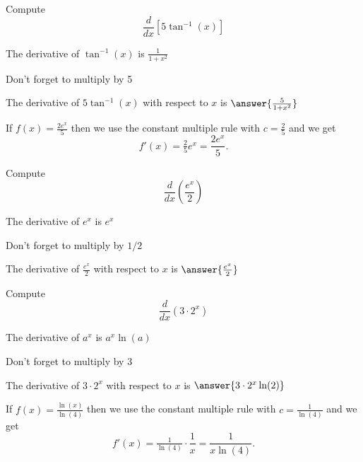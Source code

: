 \documentclass[handout]{ximera}
\begin{document}
\begin{problem} %
  Compute 
  \[
  \frac{d}{dx} \left[5\tan^{-1}(x)\right]
  \]
  
    \begin{hint}
      The derivative of $\tan^{-1}(x)$ is $\frac{1}{1+x^2}$
    \end{hint}
		\begin{hint}
		  Don't forget to multiply by 5
		\end{hint}
		
		The derivative of $5\tan^{-1}(x)$ with respect to $x$ is
		 $\answer{\frac{5}{1+x^2}}$
	
\end{problem}


\begin{example} %
 If $f(x) = \frac{2e^x}{5}$ then we use the constant multiple rule with $c = \frac25$ and we get 
\[
f'(x) = \tfrac25 e^x = \frac{2e^x}{5}.
\]
\end{example}


\begin{problem} %
  Compute 
  \[
  \frac{d}{dx} \left(\frac{e^x}{2}\right)
  \]
  
    \begin{hint}
      The derivative of $e^x$ is $e^x$
    \end{hint}
		\begin{hint}
		  Don't forget to multiply by $1/2$
		\end{hint}
		
		The derivative of $\frac{e^x}{2}$ with respect to $x$ is
		 $\answer{\frac{e^x}{2}}$
	
\end{problem}


\begin{problem} %
  Compute 
  \[
  \frac{d}{dx} \left(3\cdot 2^x\right)
  \]
  
    \begin{hint}
      The derivative of $a^x$ is $a^x \ln(a)$
    \end{hint}
		\begin{hint}
		  Don't forget to multiply by $3$
		\end{hint}
		
		The derivative of $3\cdot 2^x$ with respect to $x$ is
		 $\answer{3\cdot 2^x \ln(2)}$
	
\end{problem}


\begin{example} %
 If $f(x) = \frac{\ln(x)}{\ln(4)}$ then we use the constant multiple rule with $c = \frac{1}{\ln(4)}$ 
and we get 
\[
f'(x) = \tfrac{1}{\ln(4)} \cdot \frac{1}{x} = \frac{1}{x\ln(4)}.
\]
\end{example}
\end{document}
